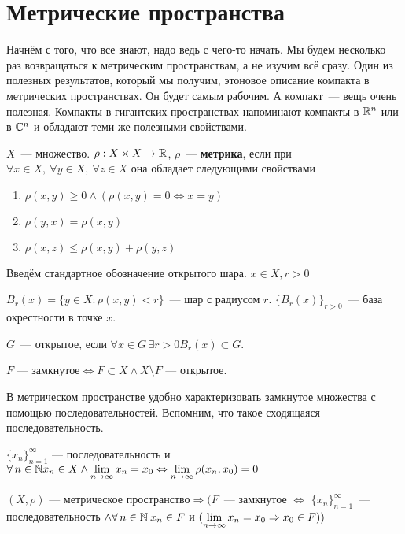 \documentclass[document]{subfiles}
\begin{document}
\chapter{Метрические пространства}
Начнём с того, что все знают, надо ведь с чего-то начать. Мы будем несколько раз возвращаться к метрическим пространствам, а не изучим всё сразу. Один из полезных результатов, который мы получим, этоновое описание компакта в метрических пространствах. Он будет
самым рабочим. А компакт~--- вещь очень полезная. Компакты в гигантских пространствах напоминают компакты в $\mathbb{R}^n$ или в $\mathbb{C}^n$ и обладают теми же полезными свойствами.

\begin{definition}[Метрика]
    $X$~--- множество. $\rho: X \times X \rightarrow \mathbb{R}$, $\rho$~--- \textbf{метрика}, если при $\forall x \in X, \: \forall y \in X, \: \forall z \in X$ она обладает следующими свойствами 
    \begin{enumerate}
        \item $\rho(x,y) \geq 0 \land (\rho(x,y) = 0 \Leftrightarrow x = y)$
        \item $\rho(y,x) = \rho(x,y)$
        \item $\rho(x,z) \leq \rho(x,y) + \rho(y,z)$
    \end{enumerate}
\end{definition}

Введём стандартное обозначение открытого шара. $x \in X, r > 0$

$B_r(x) = \{y \in X: \rho(x,y) < r \}$~--- шар с радиусом $r$.
$ \{B_r(x) \}_{r > 0}$~--- база окрестности в точке $x$.

$G$~--- открытое, если $\forall x \in G \, \exists r > 0 B_r(x) \subset G$.

$F \text{~--- замкнутое} \Leftrightarrow F \subset X \land X \setminus F\text{~--- открытое}$.

В метрическом пространстве удобно характеризовать замкнутое множества с помощью последовательностей. Вспомним, что такое сходящаяся последовательность.

$\{x_n\}_{n=1}^\infty\text{~--- последовательность}$ и $\forall n \in \bN x_n \in X \land \liml_{n \to \infty} x_n = x_0 \Leftrightarrow \liml_{n \to \infty} \rho(x_n, x_0) = 0$

$(X, \rho)\text{~--- метрическое пространство} \Rightarrow (F$~--- замкнутое $\Leftrightarrow$ $\{x_n\}_{n=1}^\infty$~--- последовательность $\land \forall n \in \bN \: x_n \in F$ и $(\lim\limits_{n \to \infty } x_n = x_0 \Rightarrow x_0 \in F))$
\end{document}
